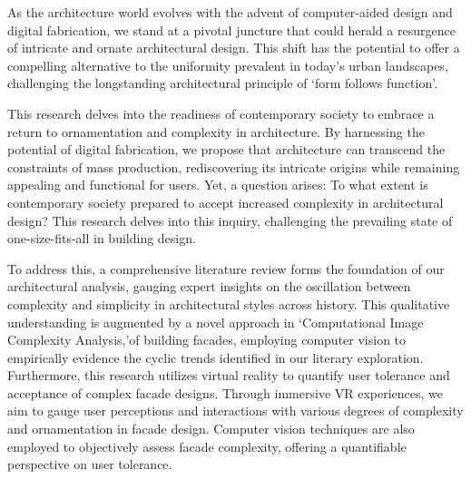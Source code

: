 


As the architecture world evolves with the advent of computer-aided design and digital fabrication, we stand at a pivotal juncture that could herald a resurgence of intricate and ornate architectural design.
This shift has the potential to offer a compelling alternative to the uniformity prevalent in today's urban landscapes, challenging the longstanding architectural principle of `form follows function'\cite{Gage2015}.

This research delves into the readiness of contemporary society to embrace a return to ornamentation and complexity in architecture.
By harnessing the potential of digital fabrication, we propose that architecture can transcend the constraints of mass production, rediscovering its intricate origins while remaining appealing and functional for users.
Yet, a question arises: To what extent is contemporary society prepared to accept increased complexity in architectural design?
This research delves into this inquiry, challenging the prevailing state of one-size-fits-all in building design.

To address this, a comprehensive literature review forms the foundation of our architectural analysis, gauging expert insights on the oscillation between complexity and simplicity in architectural styles across history.
This qualitative understanding is augmented by a novel approach in `Computational Image Complexity Analysis,'of building facades, employing computer vision to empirically evidence the cyclic trends identified in our literary exploration.
Furthermore, this research utilizes virtual reality to quantify user tolerance and acceptance of complex facade designs.
Through immersive VR experiences, we aim to gauge user perceptions and interactions with various degrees of complexity and ornamentation in facade design.
Computer vision techniques are also employed to objectively assess facade complexity, offering a quantifiable perspective on user tolerance.

